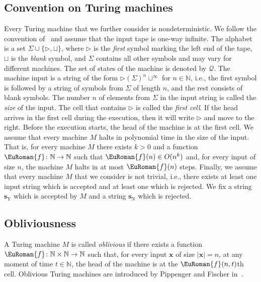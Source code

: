 \documentclass[10pt,a4paper]{amsart}
\theoremstyle{plain}
\theoremstyle{definition}
\numberwithin{equation}{section}
\newcommand{\eurm}[1]{\EuRoman{#1}} %
\newcommand{\euca}[1]{\mathcal{#1}} %
\newcommand{\ie}{i.e.\xspace}  %
\newcommand{\tuple}[1]{\mathbf{#1}} %
\newcommand{\family}[1]{\euca{#1}} %
\newcommand{\func}[1]{\eurm{#1}}  %
\newcommand{\card}[1]{\vert #1 \vert}  %
\begin{document}
\subsection*{Convention on Turing machines}
Every Turing machine that we further consider is nondeterministic. We follow the convention of~\cite{papadimitriou_book} and assume that the input tape is one-way infinite. The alphabet is a set $\Sigma\cup\{\triangleright,\sqcup\}$, where $\triangleright$ is the \emph{first} symbol marking the left end of the tape, $\sqcup$ is the \emph{blank} symbol, and $\Sigma$ contains all other symbols and may vary for different machines. The set of states of the machine is denoted by $\family{Q}$. The machine input is a string of the form $\triangleright(\Sigma)^n\sqcup^\infty$ for $n\in\mathbb{N}$, \ie, the first symbol is followed by a string of symbols from $\Sigma$ of length $n$, and the rest consists of blank symbols. The number $n$ of elements from $\Sigma$ in the input string is called the \emph{size} of the input. The cell  that contains $\triangleright$ is called the \emph{first cell}. If the head arrives in the first cell during the execution, then it will write $\triangleright$ and move to the right. Before the execution starts, the head of the machine is at the first cell. We assume that every machine $M$ halts in polynomial time in the size of the input. That is, for every machine $M$ there exists $k>0$ and a function $\func{f}\colon\mathbb{N}\to\mathbb{N}$ such that $\func{f}(n)\in O(n^k)$ and, for every input of size $n$, the machine $M$ halts in at most $\func{f}(n)$ steps. Finally, we assume that every machine $M$ that we consider is not trivial, \ie, there exists at least one input string which is accepted and at least one which is rejected. 
We fix a string $\tuple{s}_{\mathrm{Y}}$ which is accepted by $M$ and a string $\tuple{s}_{\mathrm{N}}$ which is rejected.
\subsection{Obliviousness}\label{subsection:obliviousness}


A Turing machine $M$ is called \emph{oblivious} if there exists a function $\func{f}\colon\mathbb{N}\times\mathbb{N}\to\mathbb{N}$ such that, for every input $\tuple{x}$ of size $\card{\tuple{x}}=n$, at any moment of time $t\in\mathbb{N}$, the head of the machine is at the $\func{f}(n,t)$th cell. Oblivious Turing machines are introduced by Pippenger and Fischer in~\cite{pippenger1979}.
\end{document}
